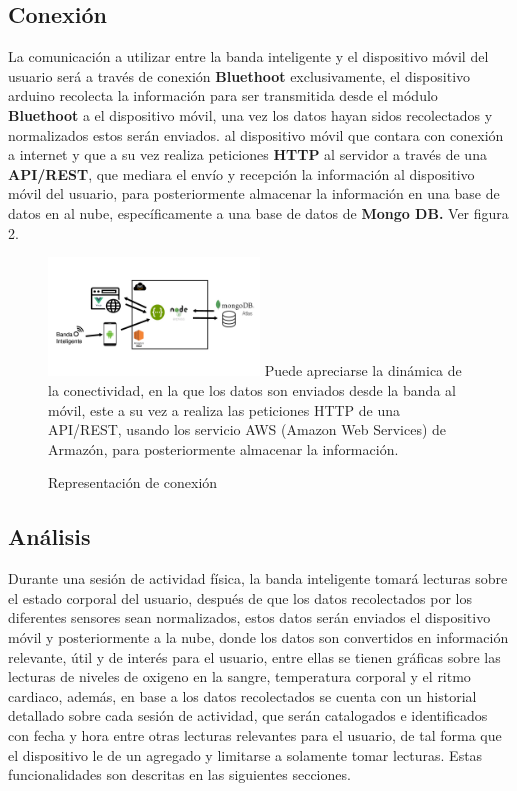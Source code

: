 \documentclass[osajnl,twocolumn,showpacs,superscriptaddress,10pt]{revtex4-1}
\begin{document}
\subsection{Conexión}
    La comunicación a utilizar entre la banda inteligente y el dispositivo móvil del usuario será a través de conexión \textbf{Bluethoot} exclusivamente, el dispositivo arduino recolecta la información para ser transmitida desde el módulo \textbf{Bluethoot} a el dispositivo móvil, una vez los datos hayan sidos recolectados y normalizados estos serán enviados.  al dispositivo móvil que contara con conexión a internet y que a su vez realiza peticiones \textbf{HTTP} al servidor a través de una \textbf{API/REST}, que mediara el envío y recepción la información al dispositivo móvil del usuario, para posteriormente almacenar la información en una base de datos en al nube, específicamente a una base de datos de \textbf{Mongo DB.} Ver figura 2. \newline
\begin{figure} [H] \centering 
\caption{Representación de conexión}
\includegraphics[width=0.5\textwidth]{Arquitectura.png} 
Puede apreciarse la dinámica de la conectividad, en la que los datos son enviados desde la banda al móvil, este a su vez a realiza las peticiones HTTP de una API/REST, usando los servicio AWS (Amazon Web Services) de Armazón, para posteriormente almacenar la información.
\end{figure}

\subsection{Análisis}
    Durante una sesión de actividad física, la banda inteligente tomará lecturas sobre el estado corporal del usuario, después de que los datos recolectados por los diferentes sensores sean normalizados, estos datos serán enviados el dispositivo móvil y posteriormente a la nube, donde los datos son convertidos en información relevante, útil y de interés para el usuario, entre ellas se tienen gráficas sobre las lecturas de niveles de oxigeno en la sangre, temperatura corporal y el ritmo cardiaco, además, en base a los datos recolectados se cuenta con un historial detallado sobre cada sesión de actividad, que serán catalogados e identificados con fecha y hora entre otras lecturas relevantes para el usuario, de tal forma que el dispositivo le de un agregado y limitarse a solamente tomar lecturas. Estas funcionalidades son descritas en las siguientes secciones.
    
\end{document}

